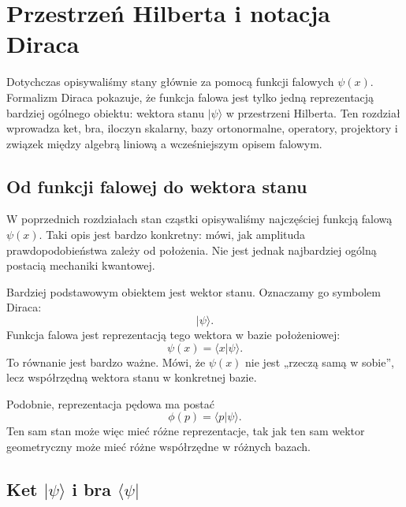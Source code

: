\chapter{Przestrzeń Hilberta i notacja Diraca}

\begin{summarybox}
Dotychczas opisywaliśmy stany głównie za pomocą funkcji falowych \(\psi(x)\).
Formalizm Diraca pokazuje, że funkcja falowa jest tylko jedną reprezentacją
bardziej ogólnego obiektu: wektora stanu \(|\psi\rangle\) w przestrzeni Hilberta.
Ten rozdział wprowadza ket, bra, iloczyn skalarny, bazy ortonormalne, operatory,
projektory i związek między algebrą liniową a wcześniejszym opisem falowym.
\end{summarybox}

\section{Od funkcji falowej do wektora stanu}

W poprzednich rozdziałach stan cząstki opisywaliśmy najczęściej funkcją falową \(\psi(x)\). Taki opis jest bardzo konkretny: mówi, jak amplituda prawdopodobieństwa zależy od położenia. Nie jest jednak najbardziej ogólną postacią mechaniki kwantowej.

Bardziej podstawowym obiektem jest wektor stanu. Oznaczamy go symbolem Diraca:
\begin{equation}
    |\psi\rangle.
\end{equation}
Funkcja falowa jest reprezentacją tego wektora w bazie położeniowej:
\begin{equation}
    \psi(x)=\langle x|\psi\rangle.
\end{equation}
To równanie jest bardzo ważne. Mówi, że \(\psi(x)\) nie jest „rzeczą samą w sobie”, lecz współrzędną wektora stanu w konkretnej bazie.

Podobnie, reprezentacja pędowa ma postać
\begin{equation}
    \phi(p)=\langle p|\psi\rangle.
\end{equation}
Ten sam stan może więc mieć różne reprezentacje, tak jak ten sam wektor geometryczny może mieć różne współrzędne w różnych bazach.

\section{Ket \texorpdfstring{\(|\psi\rangle\)}{|psi>} i bra \texorpdfstring{\(\langle\psi|\)}{<psi|}}

